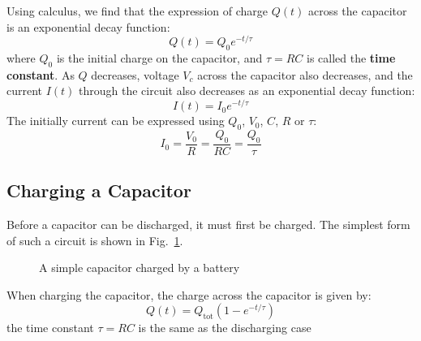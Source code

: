Using calculus, we find that the expression of charge $Q(t)$ across the
capacitor is an exponential decay function:
\begin{equation}
  \boxed{
    Q(t)=Q_0e^{-t/\tau}
  }
\end{equation}  
where $Q_0$ is the initial charge on the capacitor, and $\tau=RC$ is called the
\textbf{time constant}. As $Q$ decreases, voltage $V_c$ across the capacitor
also decreases, and the current $I(t)$ through the circuit also decreases as an
exponential decay function:
\begin{equation}
  \boxed{
    I(t)=I_0e^{-t/\tau}
  }
\end{equation}
The initially current can be expressed using $Q_0$, $V_0$, $C$, $R$ or $\tau$:
\begin{displaymath}
  I_0=\frac{V_0}R=\frac{Q_0}{RC}=\frac{Q_0}\tau
\end{displaymath}



\subsection{Charging a Capacitor}
Before a capacitor can be discharged, it must first be charged. The simplest
form of such a circuit is shown in Fig.~\ref{fig:charging-capacitor}.
\begin{figure}[ht]
  \centering
  \caption{A simple capacitor charged by a battery}
  \label{fig:charging-capacitor}
\end{figure}
  
When charging the capacitor, the charge across the capacitor is given by:
\begin{equation}
  \boxed{
    Q(t)=Q_\text{tot}(1-e^{-t/\tau})
  }
\end{equation}
the time constant $\tau=RC$ is the same as the discharging case

%    

